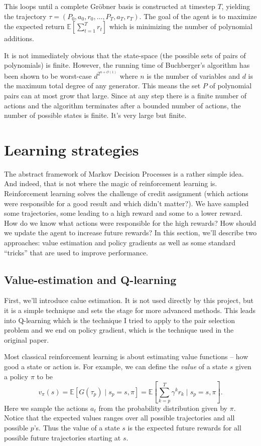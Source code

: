 \documentclass{article}
\theoremstyle{changedot}
\theoremstyle{changedotbreak}
\theoremstyle{nonumberplain}
\newcommand{\m}{\mathbb}
\begin{document}
This loops until a complete Gröbner basis is constructed at timestep $T$, yielding the trajectory $\tau = (P_{0}, a_{0}, r_{0}, \dots, P_{T}, a_{T}, r_{T})$. The goal of the agent is to maximize the expected return $\m E[\sum_{t=1}^{T} r_{t}]$ which is minimizing the number of polynomial additions.

It is not immediately obvious that the state-space (the possible sets of pairs of polynomials) is finite. However, the running time of Buchberger's algorithm has been shown to be worst-case $d^{2^{n+\mathcal{O}(1)}}$ where $n$ is the number of variables and $d$ is the maximum total degree of any generator. This means the set $P$ of polynomial pairs can at most grow that large. Since at any step there is a finite number of actions and the algorithm terminates after a bounded number of actions, the number of possible states is finite. It's very large but finite.

\section{Learning strategies}
The abstract framework of Markov Decision Processes is a rather simple idea. And indeed, that is not where the magic of reinforcement learning is. Reinforcement learning solves the challenge of credit assignment (which actions were responsible for a good result and which didn't matter?). We have sampled some trajectories, some leading to a high reward and some to a lower reward. How do we know what actions were responsible for the high rewards? How should we update the agent to increase future rewards? In this section, we'll describe two approaches: value estimation and policy gradients as well as some standard ``tricks'' that are used to improve performance.

\subsection{Value-estimation and Q-learning}\label{sec:Qlearning}
First, we'll introduce calue estimation. It is not used directly by this project, but it is a simple technique and sets the stage for more advanced methods. This leads into Q-learning which is the technique I tried to apply to the pair selection problem and we end on policy gradient, which is the technique used in the original paper.

Most classical reinforcement learning is about estimating value functions -- how good a state or action is. For example, we can define the \emph{value} of a state $s$ given a policy $\pi$ to be \[v_{\pi}(s) = \mathbb E \left[ G(\tau_{p}) \mid s_{p} = s, \pi \right] = \m E \left[ \sum_{k=p}^{T} \gamma^{k} r_{k} \mid s_{p} = s, \pi \right].\] Here we sample the actions $a_{t}$ from the probability distribution given by $\pi$. Notice that the expected values ranges over all possible trajectories and all possible $p$'s. Thus the value of a state $s$ is the expected future rewards for all possible future trajectories starting at $s$.
\end{document}
